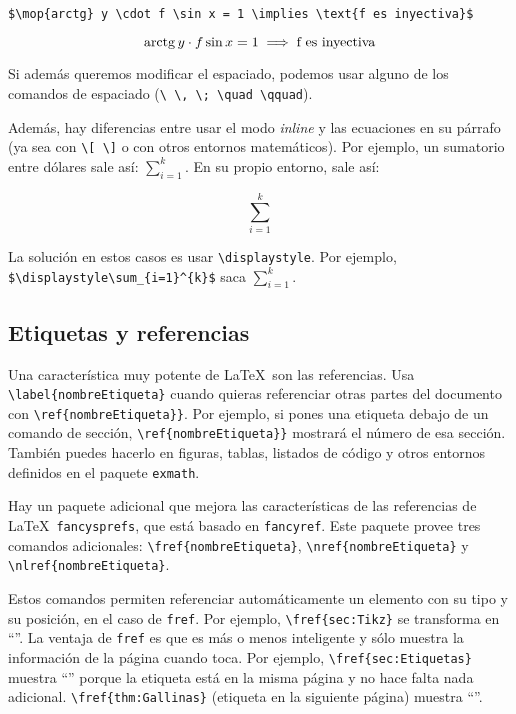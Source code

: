 \documentclass[nochap]{apuntes}
\begin{document}
\begin{center}
\verb|$\mop{arctg} y \cdot f \sin x = 1 \implies \text{f es inyectiva}$|
\end{center}

\[ \mathrm{arctg}\, y \cdot f \sin x = 1 \implies \text{f es inyectiva} \]

Si además queremos modificar el espaciado, podemos usar alguno de los comandos de espaciado (\verb|\ \, \; \quad \qquad|).

Además, hay diferencias entre usar el modo \textit{inline} y las ecuaciones en su párrafo (ya sea con \verb|\[ \]| o con otros entornos matemáticos). Por ejemplo, un sumatorio entre dólares sale así: $\sum_{i=1}^{k}$. En su propio entorno, sale así:

\[ \sum_{i=1}^{k} \]

La solución en estos casos es usar \verb|\displaystyle|. Por ejemplo, \verb|$\displaystyle\sum_{i=1}^{k}$| saca $\displaystyle\sum_{i=1}^{k}$.

\subsection{Etiquetas y referencias}
\label{sec:Etiquetas}

Una característica muy potente de \LaTeX\ son las referencias. Usa \verb|\label{nombreEtiqueta}| cuando quieras referenciar otras partes del documento con \verb|\ref{nombreEtiqueta}}|. Por ejemplo, si pones una etiqueta debajo de un comando de sección, \verb|\ref{nombreEtiqueta}}| mostrará el número de esa sección. También puedes hacerlo en figuras, tablas, listados de código y otros entornos definidos en el paquete \texttt{exmath}.

Hay un paquete adicional que mejora las características de las referencias de \LaTeX\, \texttt{fancysprefs}, que está basado en \texttt{fancyref}. Este paquete provee tres comandos adicionales: \verb|\fref{nombreEtiqueta}|, \verb|\nref{nombreEtiqueta}| y \verb|\nlref{nombreEtiqueta}|.

Estos comandos permiten referenciar automáticamente un elemento con su tipo y su posición, en el caso de \texttt{fref}. Por ejemplo, \verb|\fref{sec:Tikz}| se transforma en ``''. La ventaja de \texttt{fref} es que es más o menos inteligente y sólo muestra la información de la página cuando toca. Por ejemplo, \verb|\fref{sec:Etiquetas}| muestra ``'' porque la etiqueta está en la misma página y no hace falta nada adicional. \verb|\fref{thm:Gallinas}| (etiqueta en la siguiente página) muestra ``''.
\end{document}
